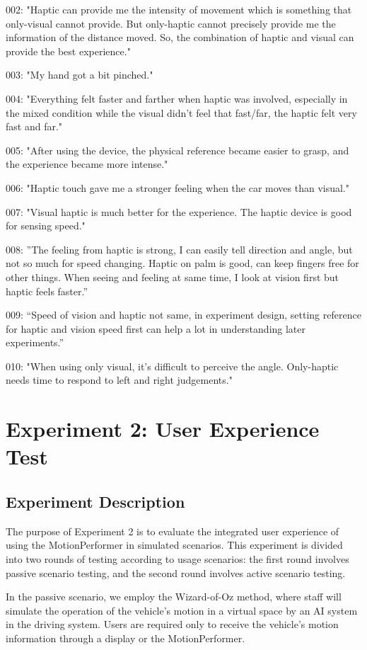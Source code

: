 002: "Haptic can provide me the intensity of movement which is something that only-visual cannot provide. But only-haptic cannot precisely provide me the information of the distance moved. So, the combination of haptic and visual can provide the best experience."

003: "My hand got a bit pinched."

004: "Everything felt faster and farther when haptic was involved, especially in the mixed condition while the visual didn’t feel that fast/far, the haptic felt very fast and far."

005: "After using the device, the physical reference became easier to grasp, and the experience became more intense."

006: "Haptic touch gave me a stronger feeling when the car moves than visual."

007: "Visual haptic is much better for the experience. The haptic device is good for sensing speed."

008: ”The feeling from haptic is strong, I can easily tell direction and angle, but not so much for speed changing. Haptic on palm is good, can keep fingers free for other things. When seeing and feeling at same time, I look at vision first but haptic feels faster.”

009: “Speed of vision and haptic not same, in experiment design, setting reference for haptic and vision speed first can help a lot in understanding later experiments.”

010: "When using only visual, it's difficult to perceive the angle. Only-haptic needs time to respond to left and right judgements."


\section{Experiment 2: User Experience Test}
\subsection{Experiment Description}
The purpose of Experiment 2 is to evaluate the integrated user experience of using the MotionPerformer in simulated scenarios. This experiment is divided into two rounds of testing according to usage scenarios: the first round involves passive scenario testing, and the second round involves active scenario testing.

In the passive scenario, we employ the Wizard-of-Oz method\cite{paper37}, where staff will simulate the operation of the vehicle's motion in a virtual space by an AI system in the driving system. Users are required only to receive the vehicle's motion information through a display or the MotionPerformer.

